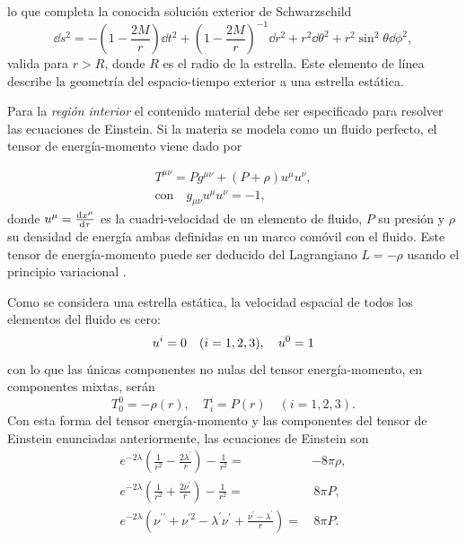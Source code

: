 lo que completa la conocida solución exterior de Schwarzschild
\begin{equation}
    \dd{s} ^ { 2 } = - \left( 1 - \frac { 2 M } { r } \right) \dd{t} ^ { 2 } + \left( 1 - \frac { 2 M } { r } \right) ^ { - 1 } \dd{r} ^ { 2 }  + r ^ { 2 } \dd{\theta} ^ { 2 } + r ^ { 2 } \sin ^ { 2 } \theta \dd{\phi} ^ { 2 }, \label{schwarzs}
\end{equation}
valida para $r>R$, donde $R$ es el radio de la estrella. Este elemento de línea describe la geometría del espacio-tiempo exterior a una estrella estática.

Para la \textit{región interior} el contenido material debe ser especificado para resolver las ecuaciones de Einstein. Si la materia se modela como un fluido perfecto, el tensor de energía-momento viene dado por

\begin{equation}\label{EMT}
    \begin{array} { c } { T ^ { \mu \nu } =  P g ^ { \mu \nu } + ( P + \rho ) u ^ { \mu } u ^ { \nu } }, \\ \text{con} \quad { g _ { \mu \nu } u ^ { \mu } u ^ { \nu } = -1 }, \end{array}
\end{equation}
donde $u^{\mu}=\dv{x^{\mu}}{\tau}$ es la cuadri-velocidad de un elemento de fluido, $P$ su presión y $\rho$ su densidad de energía ambas definidas en un marco comóvil con el fluido. Este tensor de energía-momento puede ser deducido del Lagrangiano $L=-\rho$ usando el principio variacional \cite{Felice19992}.

Como se considera una estrella estática, la velocidad espacial de todos los elementos del fluido es cero:
\begin{equation}
    u^{i}=0 \quad (i=1,2,3)\qc u ^ { 0 } = 1
\end{equation}
con lo que las únicas componentes no nulas del tensor energía-momento, en componentes mixtas, serán
\begin{equation}
T _ { 0 } ^ { 0 } = -\rho(r) , \quad T _ { i } ^ { i } =  P(r) \quad ( i=1,2,3 ).  
\end{equation}
Con esta forma del tensor energía-momento y las componentes del tensor de Einstein enunciadas anteriormente, las ecuaciones de Einstein son
\begin{align}
     e ^ { - 2 \lambda } \left( \frac { 1 } { r ^ { 2 } } - \frac { 2 \lambda ^ { \prime } } { r } \right) - \frac { 1 } { r ^ { 2 } } =&  -8\pi\rho, \label{E00} \\
    e ^ { - 2 \lambda } \left( \frac { 1 } { r ^ { 2 } } + \frac { 2 \nu ^ { \prime } } { r } \right) - \frac { 1 } { r ^ { 2 } } =& \, 8\pi P, \label{E11}\\
    e ^ { - 2 \lambda } \left( \nu ^ { \prime \prime } + \nu ^ { \prime 2 } - \lambda ^ { \prime } \nu ^ { \prime } + \frac { \nu ^ { \prime } - \lambda ^ { \prime } } { r } \right) =& \, 8\pi P. \label{E22}
\end{align}

